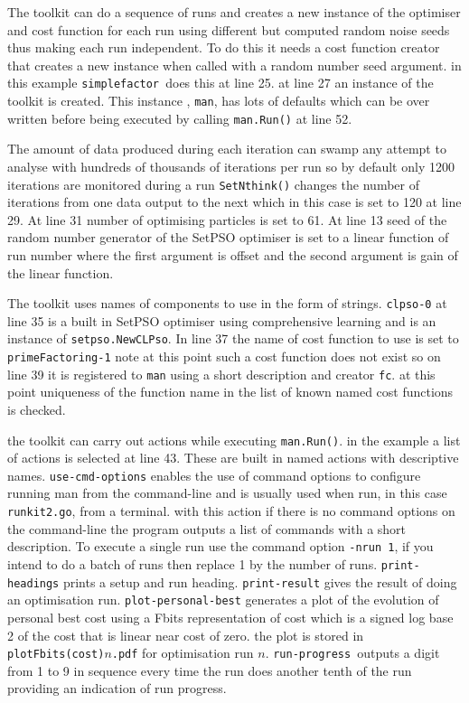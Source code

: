 \documentclass[a4paper,oneside,english]{book}
\numberwithin{equation}{section}
\numberwithin{figure}{section}
\begin{document}
The toolkit can do a sequence of runs and creates a new instance of the optimiser and cost function for each run using different but computed random noise seeds thus making each run independent. To do this it needs a cost function creator  that creates a new instance  when called with a random number seed argument.  in this example \texttt{simplefactor }does this at line 25. at line 27 an instance of the toolkit is created. This instance , \texttt{man}, has lots of defaults which can be over written before  being executed by calling 
\texttt{man.Run()} at line 52. 

The amount of data produced during each iteration can swamp any attempt to analyse  with hundreds of thousands of iterations per run so by default only 1200 iterations are monitored during a run \texttt{SetNthink()} changes the number of iterations from one data output to the next which in this case is set to 120 at line 29.  At line 31 number of optimising particles is set to 61. At line 13 seed of the random number generator of the SetPSO optimiser is set to a linear function of  run number where the first argument is offset and the second argument is gain of the linear function. 

The toolkit uses names of components to use in the form of strings. \texttt{clpso-0} at line 35 is a built in SetPSO optimiser using comprehensive learning and is an instance of  \texttt{setpso.NewCLPso}. In line 37 the name of cost function to use is set to \texttt{primeFactoring-1} note at this point such a cost function does not exist so on line 39 it is registered to \texttt{man} using a short description and creator \texttt{fc}. at this point   uniqueness of the function name in the list of known  named cost  functions is checked.

the toolkit can carry out actions while executing \texttt{man.Run()}. in the example a list of actions is selected at line 43. These are built in named actions with descriptive names. \texttt{use-cmd-options} enables the use of command options to configure running man from the command-line and is usually used when run, in this case\texttt{ runkit2.go}, from a terminal. with this action if there is no command options on the command-line the program outputs a list of commands  with a short description. To execute a single  run  use the command option \texttt{-nrun 1}, if you intend to do a batch of runs then replace 1 by the number of runs. \texttt{print-headings} prints a setup and run heading. \texttt{print-result} gives the result of doing an optimisation run. \texttt{plot-personal-best} generates a plot of the evolution of personal best cost using a Fbits representation of cost which is a signed log base 2 of the cost that is linear near cost of zero. the plot is stored in \texttt{plotFbits(cost)}$n$\texttt{.pdf} for optimisation run $n$.  \texttt{run-progress }outputs a digit from 1 to 9 in sequence every time the run does  another tenth of the run providing an indication of run progress.   
\end{document}
